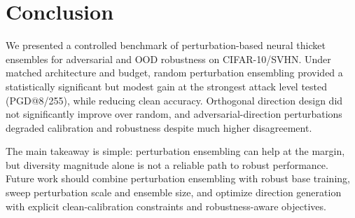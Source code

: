 \section{Conclusion}
\label{sec:conclusion}

We presented a controlled benchmark of perturbation-based neural thicket ensembles for adversarial and OOD robustness on CIFAR-10/SVHN. Under matched architecture and budget, random perturbation ensembling provided a statistically significant but modest gain at the strongest attack level tested (PGD@8/255), while reducing clean accuracy. Orthogonal direction design did not significantly improve over random, and adversarial-direction perturbations degraded calibration and robustness despite much higher disagreement.

The main takeaway is simple: perturbation ensembling can help at the margin, but diversity magnitude alone is not a reliable path to robust performance. Future work should combine perturbation ensembling with robust base training, sweep perturbation scale and ensemble size, and optimize direction generation with explicit clean-calibration constraints and robustness-aware objectives.
